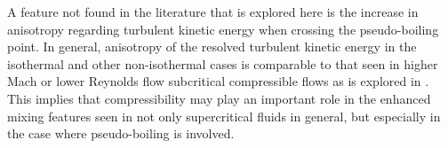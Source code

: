 A feature not found in the literature that is explored here is the increase in anisotropy regarding turbulent kinetic energy when crossing the pseudo-boiling point. In general, anisotropy of the resolved turbulent kinetic energy in the isothermal and other non-isothermal cases is comparable to that seen in higher Mach or lower Reynolds flow subcritical compressible flows as is explored in \cite{iso_comp_2}. This implies that compressibility may play an important role in the enhanced mixing features seen in not only supercritical fluids in general, but especially in the case where pseudo-boiling is involved. 




